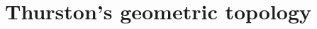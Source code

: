\documentclass[reqno,11pt]{amsart}
\newcommand{\RR}{\mathbf{R}}
\newcommand{\CC}{\mathbf{C}}
\newcommand{\Hyp}{\mathbf H}
\DeclareMathOperator{\dist}{dist}
\newcommand{\Leaves}{\mathscr L}
\newcommand{\Hypspace}{\mathscr H}
\newtheorem{proposition}[theorem]{Proposition}
\theoremstyle{definition}
\newtheorem{definition}[theorem]{Definition}
\newtheorem{example}[theorem]{Example}
\numberwithin{equation}{section}
\begin{document}
\section{Thurston's geometric topology}
%
%
%
%
%
%
%
\end{document}
